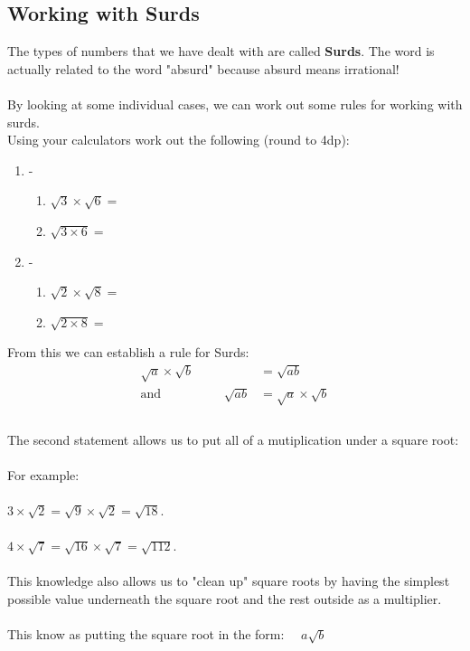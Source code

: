 \documentclass[a4paper,12pt]{article}
\begin{document}
\subsection {Working with Surds}
The types of numbers that we have dealt with are called \textbf{Surds}. The word is actually related to the word "absurd" because absurd means irrational!\\\\
By looking at some individual cases, we can work out some rules for working with surds.\\
Using your calculators work out the following (round to 4dp):
\begin{enumerate}
	\item -
	\begin{enumerate}
		\item $\sqrt{3}\times\sqrt{6}=$
		\item $\sqrt{3\times6}=$
	\end{enumerate}
	\item -
	\begin{enumerate}
		\item $\sqrt{2}\times\sqrt{8}=$
		\item $\sqrt{2\times8}=$
	\end{enumerate}
\end{enumerate}
From this we can establish a rule for Surds:
\begin{equation*}
\begin{split}
\sqrt{a}\times\sqrt{b}&=\sqrt{ab}\\
\text{and~~~~~~~~~~~~~~~}\sqrt{ab}&=\sqrt{a}\times\sqrt{b}\\
\end{split}
\end{equation*}\\
The second statement allows us to put all of a mutiplication under a square root:\\\\
For example:\\\\
 $3\times\sqrt{2}=\sqrt{9}\times\sqrt{2}=\sqrt{18}$.\\\\
 $4\times\sqrt{7}=\sqrt{16}\times\sqrt{7}=\sqrt{112}$.
\\\\
This knowledge also allows us to "clean up" square roots by having the simplest possible value underneath the square root and the rest outside as a multiplier.\\\\
This know as putting the square root in the form:~~ $a\sqrt{b}$\\
\newpage
\end{document}
